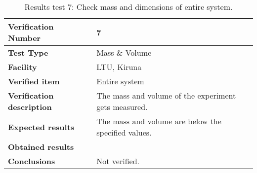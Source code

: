 \begin{table}[H]
\centering

\begin{tabular}{|m{}| m{} |}
\hline
\textbf{Verification Number} 		& 7 				\\ \hline
\textbf{Test Type} 					& Mass \& Volume 	\\ \hline
\textbf{Facility} 					& LTU, Kiruna 		\\ \hline
\textbf{Verified item} 				& Entire system 	\\ \hline

\textbf{Verification description} 	& The mass and volume of the experiment gets measured. \\ \hline

\textbf{Expected results} 			& The mass and volume are below the specified values. \\ \hline

\textbf{Obtained results} 			& \\ \hline

\textbf{Conclusions} 				& Not verified.		\\ \hline
\end{tabular}
\caption{Results test 7: Check mass and dimensions of entire system.}
\label{tab:testresult7:mass-volume}
\end{table}


\raggedbottom